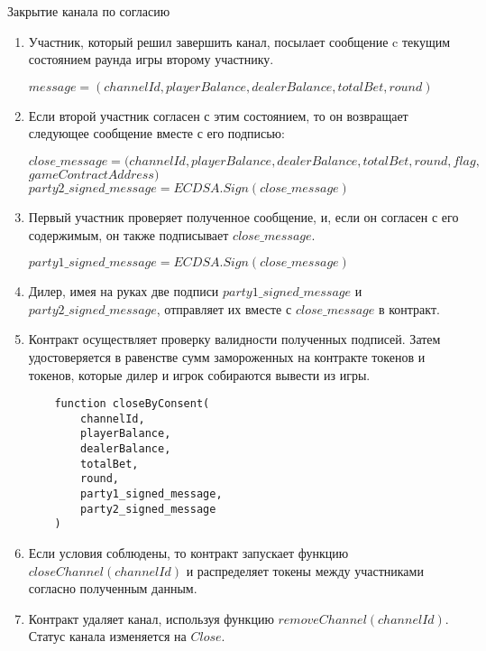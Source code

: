 \begin{algorithm}
\caption{Закрытие канала по согласию} \label{alg:close1}
\begin{enumerate}
	\item Участник, который решил завершить канал, посылает сообщение c текущим состоянием раунда игры второму участнику.
\begin{center}
$message = (channelId, playerBalance, dealerBalance, totalBet, round)$
\end{center} 
	\item Если второй участник согласен с этим состоянием, то он возвращает следующее сообщение вместе с его подписью:
\begin{center}
$close\_message = (channelId, playerBalance, dealerBalance, totalBet, round, flag,$\\$ gameContractAddress)$\\
$party2\_signed\_message = ECDSA.Sign(close\_message)$
\end{center}
	\item Первый участник проверяет полученное сообщение, и, если он согласен с его содержимым, он также подписывает $close\_message$.
\begin{center}
$party1\_signed\_message = ECDSA.Sign(close\_message)$
\end{center}
	\item Дилер, имея на руках две подписи $party1\_signed\_message$ и $party2\_signed\_message$, отправляет их вместе с $close\_message$ в контракт. \label{deal_sig}
	\item Контракт осуществляет проверку валидности полученных подписей. Затем удостоверяется в равенстве сумм замороженных на контракте токенов и токенов, которые дилер и игрок собираются вывести из игры.
\begin{lstlisting}
    function closeByConsent(
        channelId,
        playerBalance,
        dealerBalance,
        totalBet,
        round,
        party1_signed_message,
        party2_signed_message 
    )
\end{lstlisting}
\end{enumerate}
\end{algorithm}

\begin{algorithm}
\begin{enumerate}
\setcounter{enumi}{5}
	\item Если условия соблюдены, то контракт запускает функцию $closeChannel(channelId)$  и распределяет токены между участниками согласно полученным данным.
	\item Контракт удаляет канал, используя функцию $removeChannel(channelId)$. Статус канала изменяется на $Close$.
\end{enumerate}
\end{algorithm}


